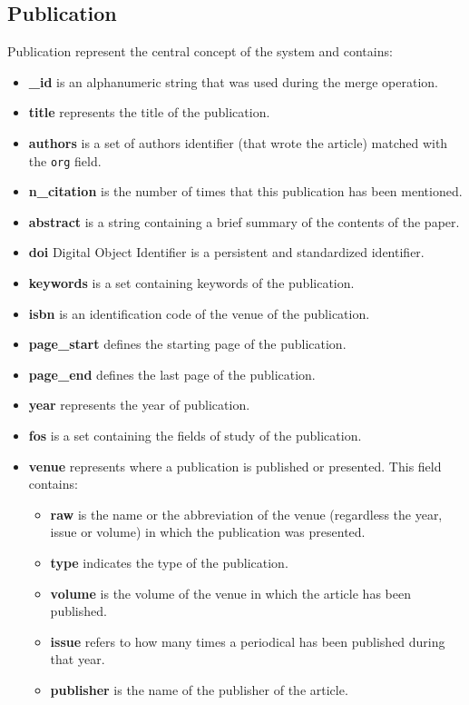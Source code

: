 \documentclass{Configuration_Files/PoliMi3i_thesis}
\begin{document}
\subsection{Publication}
Publication represent the central concept of the system and contains:
\begin{itemize}
\item \textbf{\_id} is an alphanumeric string that was used during the merge operation.
\item \textbf{title} represents the title of the publication.
\item \textbf{authors} is a set of authors identifier (that wrote the article) matched with the \verb |org| field.
\item \textbf{n\_citation} is the number of times that this publication has been mentioned.
\item \textbf{abstract} is a string containing a brief summary of the contents of the paper.
\item \textbf{doi} Digital Object Identifier is a persistent and standardized identifier.
\item \textbf{keywords} is a set containing keywords of the publication.
\item \textbf{isbn} is an identification code of the venue of the publication.
\item \textbf{page\_start} defines the starting page of the publication.
\item \textbf{page\_end} defines the last page of the publication.
\item \textbf{year} represents the year of publication.
\item \textbf{fos} is a set containing the fields of study of the publication.
\item \textbf{venue} represents where a publication is published or presented. This field contains:
				\begin{itemize}
					\item \textbf{raw} is the name or the abbreviation of the venue (regardless the year, issue or volume) in which the
						publication was presented.
					\item \textbf{type} indicates the type of the publication.
					\item \textbf{volume} is the volume of the venue in which the article has been published.
					\item \textbf{issue} refers to how many times a periodical has been published during that year.
					\item \textbf{publisher} is the name of the publisher of the article.

\end{itemize}
\end{itemize}
\end{document}
